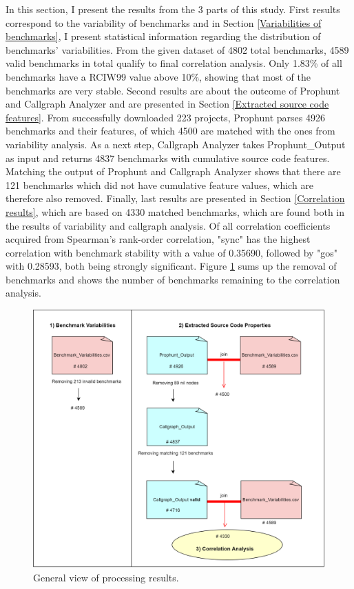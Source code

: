 \documentclass{seal_thesis}
\begin{document}
In this section, I present the results from the 3 parts of this study. First results correspond to the variability of benchmarks and in Section \ref{Variabilities of benchmarks}, I present statistical information regarding the distribution of benchmarks' variabilities. From the given dataset of 4802 total benchmarks, 4589 valid benchmarks in total qualify to final correlation analysis. Only 1.83\% of all benchmarks have a RCIW99 value above 10\%, showing that most of the benchmarks are very stable. Second results are about the outcome of Prophunt and Callgraph Analyzer and are presented in Section \ref{Extracted source code features}. From successfully downloaded 223 projects, Prophunt parses 4926 benchmarks and their features, of which 4500 are matched with the ones from variability analysis. As a next step, Callgraph Analyzer takes Prophunt\_Output as input and returns 4837 benchmarks with cumulative source code features. Matching the output of Prophunt and Callgraph Analyzer shows that there are 121 benchmarks which did not have cumulative feature values, which are therefore also removed. Finally, last results are presented in Section \ref{Correlation results}, which are based on 4330 matched benchmarks, which are found both in the results of variability and callgraph analysis. Of all correlation coefficients acquired from Spearman's rank-order correlation, "sync" has the highest correlation with benchmark stability with a value of 0.35690, followed by "gos" with 0.28593, both being strongly significant. Figure \ref{fig:results} sums up the removal of benchmarks and shows the number of benchmarks remaining to the correlation analysis.

\clearpage

\begin{figure}[H]
	\centering
	\includegraphics[width=0.9\linewidth]{ResultsGeneral}
	\caption{General view of processing results.}
	\label{fig:results}
\end{figure}
\end{document}
